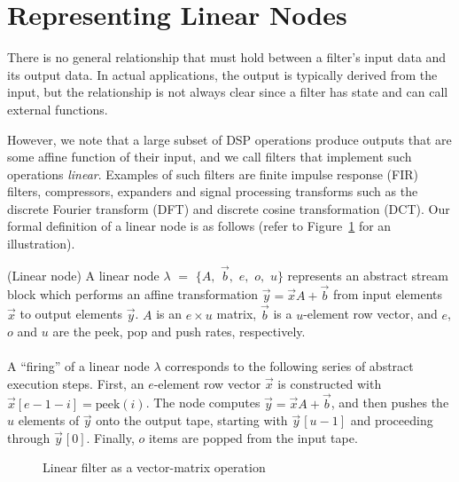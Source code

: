 \section{Representing Linear Nodes}
\label{sec:linearrep}

There is no general relationship that must hold between a
filter's input data and its output data. In actual applications, the
output is typically derived from the input, but the relationship is
not always clear since a filter has state and can call external
functions.

However, we note that a large subset of DSP operations produce outputs
that are some affine function of their input, and we call
filters that implement such operations {\it linear}. Examples of such
filters are finite impulse response (FIR) filters, compressors,
expanders and signal processing transforms such as the discrete
Fourier transform (DFT) and discrete cosine transformation (DCT).  Our
formal definition of a linear node is as follows (refer to
Figure~\ref{fig:overview-matrix} for an illustration). 
\vspace{-4pt}
\begin{definition}(Linear node)
A linear node $\lambda$ $=$ $\{A,$ $\vec{b},$ $e,$ $o,$ $u\}$
represents an abstract stream block which performs an affine
transformation $\vec{y} = \vec{x} A + \vec{b}$ from input elements 
$\vec{x}$ to output elements $\vec{y}$. $A$ is an $e \times u$ matrix, $\vec{b}$ is a
$u$-element row vector, and $e$, $o$ and $u$ are the peek, pop and
push rates, respectively. \\ 
~ \vspace{-6pt} \\
A ``firing'' of a linear node $\lambda$ corresponds to the following
series of abstract execution steps.  First, an $e$-element row vector
$\vec{x}$ is constructed with $\vec{x}[e-1-i] = \mbox{peek}(i)$.  The node
computes $\vec{y} = \vec{x} A + \vec{b}$, and then pushes the $u$ elements 
of $\vec{y}$ onto the output tape, starting with $\vec{y}\hspace{1pt}[u-1]$ 
and proceeding through $\vec{y}\hspace{1pt}[0]$.
Finally, $o$ items are popped from the input tape.
\end{definition} \vspace{-2pt}

\begin{figure}[t]
\vspace{-6pt}
\center
\epsfxsize=1.5in
\vspace{-12pt}
\caption{Linear filter as a vector-matrix operation}
\label{fig:overview-matrix}
\vspace{-6pt}
\end{figure}

